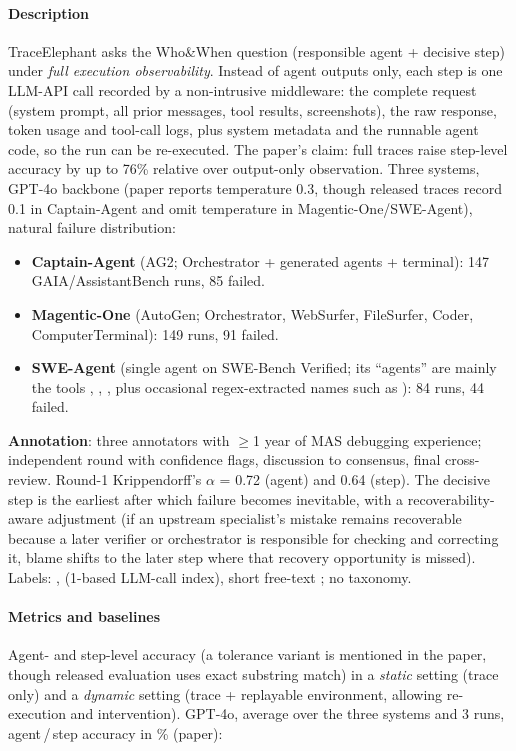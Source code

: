 \paragraph{Description} TraceElephant asks the Who\&When question (responsible agent + decisive step) under \emph{full execution observability}. Instead of agent outputs only, each step is one LLM-API call recorded by a non-intrusive middleware: the complete request (system prompt, all prior messages, tool results, screenshots), the raw response, token usage and tool-call logs, plus system metadata and the runnable agent code, so the run can be re-executed. The paper's claim: full traces raise step-level accuracy by up to 76\% relative over output-only observation. Three systems, GPT-4o backbone (paper reports temperature 0.3, though released traces record 0.1 in Captain-Agent and omit temperature in Magentic-One/SWE-Agent), natural failure distribution:
\begin{itemize}
\item \textbf{Captain-Agent} (AG2; Orchestrator + generated  agents + terminal): 147 GAIA/AssistantBench runs, 85 failed.
\item \textbf{Magentic-One} (AutoGen; Orchestrator, WebSurfer, FileSurfer, Coder, ComputerTerminal): 149 runs, 91 failed.
\item \textbf{SWE-Agent} (single agent on SWE-Bench Verified; its ``agents'' are mainly the tools , , , plus occasional regex-extracted names such as ): 84 runs, 44 failed.
\end{itemize}
\textbf{Annotation}: three annotators with $\ge$1 year of MAS debugging experience; independent round with confidence flags, discussion to consensus, final cross-review. Round-1 Krippendorff's $\alpha$ = 0.72 (agent) and 0.64 (step). The decisive step is the earliest after which failure becomes inevitable, with a recoverability-aware adjustment (if an upstream specialist's mistake remains recoverable because a later verifier or orchestrator is responsible for checking and correcting it, blame shifts to the later step where that recovery opportunity is missed). Labels: ,  (1-based LLM-call index), short free-text ; no taxonomy.

\paragraph{Metrics and baselines} Agent- and step-level accuracy (a tolerance variant is mentioned in the paper, though released evaluation uses exact substring match) in a \emph{static} setting (trace only) and a \emph{dynamic} setting (trace + replayable environment, allowing re-execution and intervention). GPT-4o, average over the three systems and 3 runs, agent\,/\,step accuracy in \% (paper):

